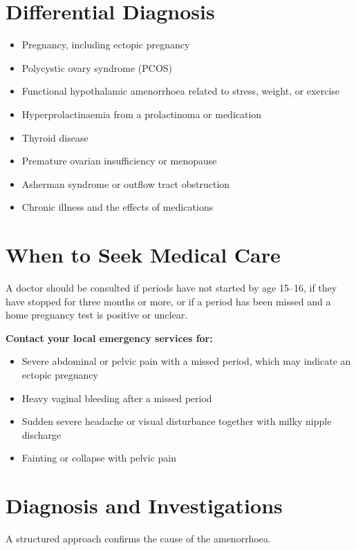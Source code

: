 \section*{Differential Diagnosis}
\begin{itemize}
    \item Pregnancy, including ectopic pregnancy
    \item Polycystic ovary syndrome (PCOS)
    \item Functional hypothalamic amenorrhoea related to stress, weight, or exercise
    \item Hyperprolactinaemia from a prolactinoma or medication
    \item Thyroid disease
    \item Premature ovarian insufficiency or menopause
    \item Asherman syndrome or outflow tract obstruction
    \item Chronic illness and the effects of medications
\end{itemize}

\section*{When to Seek Medical Care}
A doctor should be consulted if periods have not started by age 15--16, if they have stopped for three months or more, or if a period has been missed and a home pregnancy test is positive or unclear.

\textbf{Contact your local emergency services for:}
\begin{itemize}
    \item Severe abdominal or pelvic pain with a missed period, which may indicate an ectopic pregnancy
    \item Heavy vaginal bleeding after a missed period
    \item Sudden severe headache or visual disturbance together with milky nipple discharge
    \item Fainting or collapse with pelvic pain
\end{itemize}

\section*{Diagnosis and Investigations}
A structured approach confirms the cause of the amenorrhoea.

